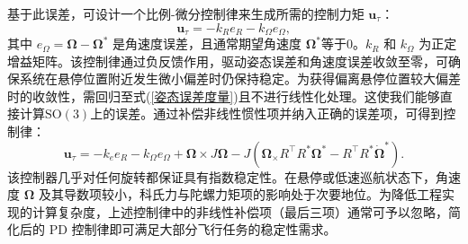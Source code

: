 基于此误差，可设计一个比例-微分控制律来生成所需的控制力矩 $\mathbf{u}_\tau$：
\begin{equation}
	\mathbf{u}_\tau = -k_R e_R - k_\Omega {e}_\Omega, \label{控制力矩}
\end{equation}
其中 ${e}_\Omega = \boldsymbol{\Omega} - \boldsymbol{\Omega}^*$ 是角速度误差，且通常期望角速度 $\boldsymbol{\Omega}^* $等于0。$k_R$ 和 $k_\Omega$ 为正定增益矩阵。该控制律通过负反馈作用，驱动姿态误差和角速度误差收敛至零，可确保系统在悬停位置附近发生微小偏差时仍保持稳定。为获得偏离悬停位置较大偏差时的收敛性，需回归至式(\ref{姿态误差度量})且不进行线性化处理。这使我们能够直接计算$ \mathrm{SO}(3) $上的误差。通过补偿非线性惯性项并纳入正确的误差项，可得到控制律：
\begin{equation}
	\mathbf{u}_\tau = 
	-k_e e_R - k_\Omega e_\Omega + 
	\boldsymbol{\Omega} \times J \boldsymbol{\Omega}
	- J ({\boldsymbol{\Omega}_\times}  R^\top R^* {\boldsymbol{\Omega}}^* - R^\top R^* \dot{\boldsymbol{\Omega}}^*) .
\end{equation}
该控制器几乎对任何旋转都保证具有指数稳定性\cite{5717652}。在悬停或低速巡航状态下，角速度 $\boldsymbol{\Omega}$ 及其导数项较小，科氏力与陀螺力矩项的影响处于次要地位。为降低工程实现的计算复杂度，上述控制律中的非线性补偿项（最后三项）通常可予以忽略，简化后的 PD 控制律即可满足大部分飞行任务的稳定性需求\cite{5980409}。

